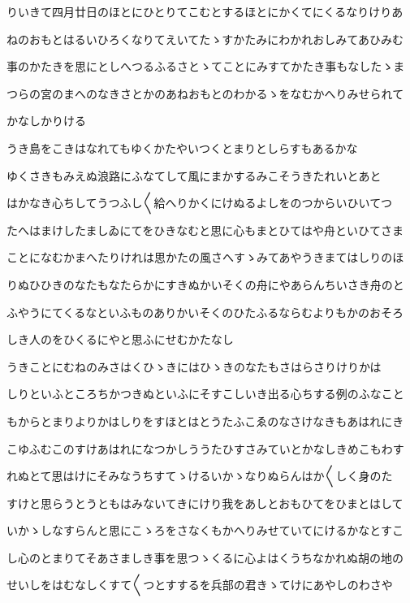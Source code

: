 \documentclass[a4paper,11pt,landscape]{ltjtarticle}
\begin{document}
りいきて四月廿日のほとにひとりてこむとするほとにかくてにくるなりけりあ
\par\medskip
ねのおもとはるいひろくなりてえいてたゝすかたみにわかれおしみてあひみむ
\par\medskip
事のかたきを思にとしへつるふるさとゝてことにみすてかたき事もなしたゝま
\par\medskip
つらの宮のまへのなきさとかのあねおもとのわかるゝをなむかへりみせられて
\par\medskip
かなしかりける
\par\medskip
うき島をこきはなれてもゆくかたやいつくとまりとしらすもあるかな
\par\medskip
ゆくさきもみえぬ浪路にふなてして風にまかするみこそうきたれいとあと
\par\medskip
はかなき心ちしてうつふし〱給へりかくにけぬるよしをのつからいひいてつ
\par\medskip
たへはまけしたましゐにてをひきなむと思に心もまとひてはや舟といひてさま
\par\medskip
ことになむかまへたりけれは思かたの風さへすゝみてあやうきまてはしりのほ
\par\medskip
りぬひひきのなたもなたらかにすきぬかいそくの舟にやあらんちいさき舟のと
\par\medskip
ふやうにてくるなといふものありかいそくのひたふるならむよりもかのおそろ
\par\medskip
しき人のをひくるにやと思ふにせむかたなし
\par\medskip
うきことにむねのみさはくひゝきにはひゝきのなたもさはらさりけりかは
\par\medskip
しりといふところちかつきぬといふにそすこしいき出る心ちする例のふなこと
\par\medskip
もからとまりよりかはしりをすほとはとうたふこゑのなさけなきもあはれにき
\par\medskip
こゆふむこのすけあはれになつかしううたひすさみていとかなしきめこもわす
\par\medskip
れぬとて思はけにそみなうちすてゝけるいかゝなりぬらんはか〱しく身のた
\par\medskip
すけと思らうとうともはみないてきにけり我をあしとおもひてをひまとはして
\par\medskip
いかゝしなすらんと思にこゝろをさなくもかへりみせていてにけるかなとすこ
\par\medskip
し心のとまりてそあさましき事を思つゝくるに心よはくうちなかれぬ胡の地の
\par\medskip
せいしをはむなしくすて〱つとすするを兵部の君きゝてけにあやしのわさや
\par\medskip
\end{document}
